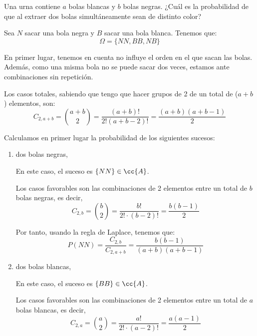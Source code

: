 \begin{ejercicio} \label{ej:3.Ejercicio4}
    Una urna contiene $a$ bolas blancas y $b$ bolas negras. ¿Cuál es la probabilidad de que al extraer dos bolas simultáneamente sean de distinto color?

    Sea $N$ sacar una bola negra y $B$ sacar una bola blanca. Tenemos que:
    \begin{equation*}
        \Omega = \{NN,BB,NB\}
    \end{equation*}

    En primer lugar, tenemos en cuenta no influye el orden en el que sacan las bolas. Además, como una misma bola no se puede sacar dos veces, estamos ante combinaciones sin repetición.   
    
    Los casos totales, sabiendo que tengo que hacer grupos de 2 de un total de ($a+b$) elementos, son:
    \begin{equation*}
        C_{2,a+b} = \binom{a+b}{2} = \frac{(a+b)!}{2!(a+b-2)!} = \frac{(a+b)(a+b-1)}{2}
    \end{equation*}

    Calculamos en primer lugar la probabilidad de los siguientes sucesos:
    \begin{enumerate}
        \item dos bolas negras,

        En este caso, el suceso es $\{NN\}\in \cc{A}$.

        Los casos favorables son las combinaciones de 2 elementos entre un total de $b$ bolas negras, es decir,
        \begin{equation*}
            C_{2,b} = \binom{b}{2} = \frac{b!}{2!\cdot (b-2)!} = \frac{b(b-1)}{2}
        \end{equation*}

        Por tanto, usando la regla de Laplace, tenemos que:
        \begin{equation*}
            P(NN)=\frac{C_{2,b}}{C_{2,a+b}} = \frac{b(b-1)}{(a+b)(a+b-1)}
        \end{equation*}
        
        \item dos bolas blancas,

        En este caso, el suceso es $\{BB\}\in \cc{A}$.
        
        Los casos favorables son las combinaciones de 2 elementos entre un total de $a$ bolas blancas, es decir,
        \begin{equation*}
            C_{2,a} = \binom{a}{2} = \frac{a!}{2!\cdot (a-2)!} = \frac{a(a-1)}{2}
        \end{equation*}


\end{enumerate}
\end{ejercicio}
